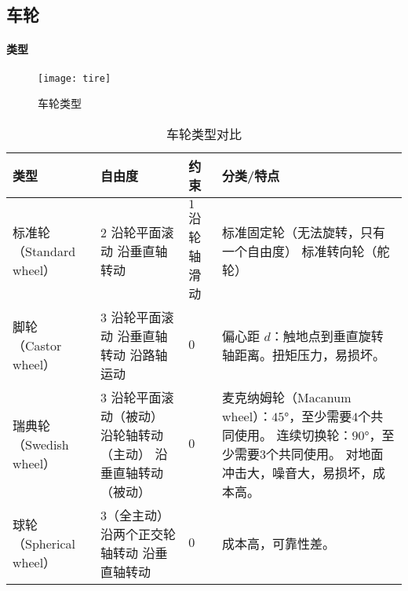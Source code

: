 \documentclass[
12pt, %
a4paper, 
oneside, %
headinclude,footinclude, %
]{scrartcl}
\begin{document}
\subsection[车轮]{车轮}
\paragraph{类型}
\begin{figure}[H]
\centering 
\texttt{[image: tire]} 
\caption{车轮类型}
\end{figure}

\begin{table}[H]
\centering
\begin{tabular}{|p{2cm}|p{4.2cm}|p{2.2cm}|p{7cm}|}
\hline
类型 & 自由度 & 约束 & 分类/特点 \\
\hline
标准轮 \newline （Standard wheel） & $ 2 $ \newline 沿轮平面滚动 \newline 沿垂直轴转动 & $ 1 $ \newline 沿轮轴滑动 & 标准固定轮（无法旋转，只有一个自由度） \newline 标准转向轮（舵轮） \\
\hline
脚轮 \newline （Castor wheel） & $ 3 $ \newline 沿轮平面滚动 \newline 沿垂直轴转动 \newline 沿路轴运动 & $ 0 $ & 偏心距 $ d $：触地点到垂直旋转轴距离。扭矩压力，易损坏。 \\
\hline
瑞典轮 \newline （Swedish wheel） & $ 3 $ \newline 沿轮平面滚动（被动） \newline 沿轮轴转动（主动） \newline 沿垂直轴转动（被动） & $ 0 $ & 麦克纳姆轮（Macanum wheel）：$ 45° $，至少需要$ 4 $个共同使用。 \newline 连续切换轮：$ 90° $，至少需要$ 3 $个共同使用。 \newline 对地面冲击大，噪音大，易损坏，成本高。 \\
\hline
球轮 \newline （Spherical wheel） & $ 3 $（全主动） \newline 沿两个正交轮轴转动 \newline 沿垂直轴转动 & $ 0 $ & 成本高，可靠性差。 \\
\hline
\end{tabular}
\caption{车轮类型对比}
\end{table}
\end{document}
